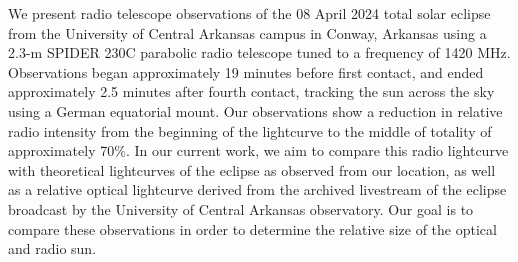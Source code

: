 We present radio telescope observations of the 08 April 2024 total solar eclipse from the University of 
Central Arkansas campus in Conway, Arkansas using a 2.3-m SPIDER 230C parabolic radio telescope tuned 
to a frequency of 1420 MHz. Observations began approximately 19 minutes before first contact, and ended 
approximately 2.5 minutes after fourth contact, tracking the sun across the sky using a German equatorial 
mount. Our observations show a reduction in relative radio intensity from the beginning of the lightcurve 
to the middle of totality of approximately 70\%. In our current work, we aim to compare this radio 
lightcurve with theoretical lightcurves of the eclipse as observed from our location, as well as a 
relative optical lightcurve derived from the archived livestream of the eclipse broadcast by the 
University of Central Arkansas observatory. Our goal is to compare these observations in order to 
determine the relative size of the optical and radio sun.